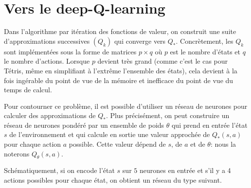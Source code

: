 \chapter{Vers le deep-Q-learning}

Dans l'algorithme par itération des fonctions de valeur, on construit une suite d'approximations successives $(Q_k)$ qui converge vers $Q_*$. Concrètement, les $Q_k$ sont implémentées sous la forme de matrices $p\times q$ où $p$ est le nombre d'états et $q$ le nombre d'actions. Lorsque $p$ devient très grand (comme c'est le cas pour Tétris, même en simplifiant à l'extrême l'ensemble des états), cela devient à la fois ingérable du point de vue de la mémoire et inefficace du point de vue du temps de calcul.

Pour contourner ce problème, il est possible d'utiliser un réseau de neurones pour calculer des approximations de $Q_*$. Plus précisément, on peut construire un réseau de neurones pondéré par un ensemble de poids $\theta$ qui prend en entrée l'état $s$ de l'environnement et qui calcule en sortie une valeur approchée de $Q_*(s,a)$ pour chaque action $a$ possible. Cette valeur dépend de $s$, de $a$ et de $\theta$: nous la noterons $Q_{\theta}(s,a)$.

Schématiquement, si on encode l'état $s$ sur $5$ neurones en entrée et s'il y a 4 actions possibles pour chaque état, on obtient un réseau du type suivant.

